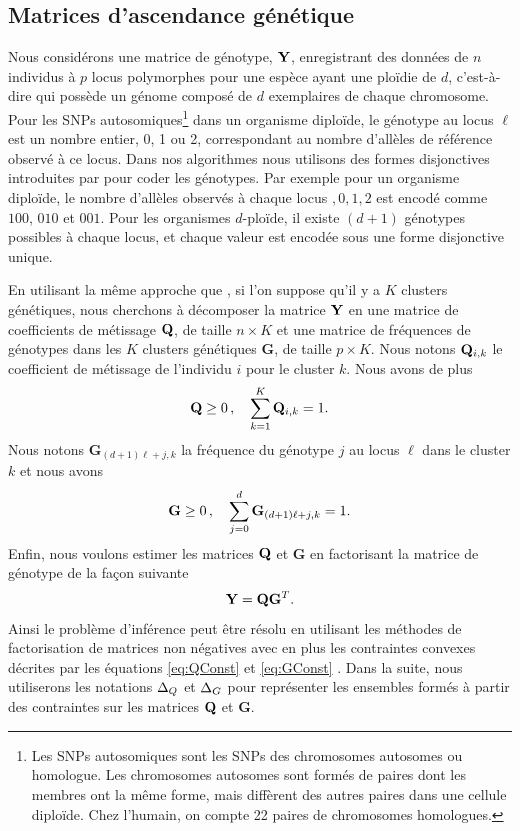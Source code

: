 \documentclass[12pt,a4paper,twoside]{ugathesis}
\begin{document}
\subsection{Matrices d'ascendance génétique}
\label{sec:org1e2088c}

Nous considérons une matrice de génotype, \(\mathbf{Y}\), enregistrant des données de \(n\)
individus à \(p\) locus polymorphes pour une espèce ayant une ploïdie de \(d\),
c'est-à-dire qui possède un génome composé de \(d\) exemplaires de chaque
chromosome. Pour les SNPs autosomiques\footnote{Les SNPs autosomiques sont les SNPs des chromosomes autosomes
ou homologue. Les chromosomes autosomes sont formés de paires dont les membres
ont la même forme, mais diffèrent des autres paires dans une cellule diploïde.
Chez l'humain, on compte 22 paires de chromosomes homologues.} dans un organisme
diploïde, le génotype au locus \(\ell\) est un nombre entier, 0, 1 ou 2,
correspondant au nombre d'allèles de référence observé à ce locus. Dans nos
algorithmes nous utilisons des formes disjonctives introduites par
\citet{Frichot_2014} pour coder les génotypes. Par exemple pour un organisme
diploïde, le nombre d'allèles observés à chaque locus \(,0,1,2\) est encodé comme
\(100\), \(010\) et \(001\). Pour les organismes \(d\text{-ploïde}\), il existe \((d + 1)\)
génotypes possibles à chaque locus, et chaque valeur est encodée sous une forme
disjonctive unique.

En utilisant la même approche que \citet{Frichot_2014}, si l'on suppose qu'il y a
\(K\) clusters génétiques, nous cherchons à décomposer la matrice \(\mathbf{Y}\) en une
matrice de coefficients de métissage \(\mathbf{Q}\), de taille \(n \times K\) et une matrice
de fréquences de génotypes dans les \(K\) clusters génétiques \(\mathbf{G}\), de taille \(p
\times K\). Nous notons \(\mathbf{Q}_{i,k}\) le coefficient de métissage de l'individu \(i\)
pour le cluster \(k\). Nous avons de plus
\begin{equation}
\label{eq:QConst}
\mathbf{Q} \geq 0 \, , \quad \sum_{k=1}^K {\bf Q}_{i,k} = 1.
\end{equation}
Nous notons \(\mathbf{G}_{(d + 1)\ell + j, k}\) la fréquence du génotype \(j\) au locus \(\ell\)
dans le cluster \(k\) et nous avons
\begin{equation}
\label{eq:GConst}
\mathbf{G} \geq 0 \, , \quad \sum_{j=0}^{d} {\bf G}_{(d+1)\ell + j, k} = 1.
\end{equation}
Enfin, nous voulons estimer les matrices \(\mathbf{Q}\) et \(\mathbf{G}\) en factorisant la matrice
de génotype de la façon suivante
\begin{equation}
\label{eq:tess3:Y}
\mathbf{Y} = \mathbf{Q} \mathbf{G}^{T}.
\end{equation}
Ainsi le problème d'inférence peut être résolu en utilisant les méthodes de
factorisation de matrices non négatives avec en plus les contraintes convexes
décrites par les équations \eqref{eq:QConst} et \eqref{eq:GConst}
\citep{lee1999learning,Cichocki2009}. Dans la suite, nous utiliserons les notations
\(\Delta_{Q}\) et \(\Delta_{G}\) pour représenter les ensembles formés à partir des contraintes
sur les matrices \(\mathbf{Q}\) et \(\mathbf{G}\).
\end{document}
